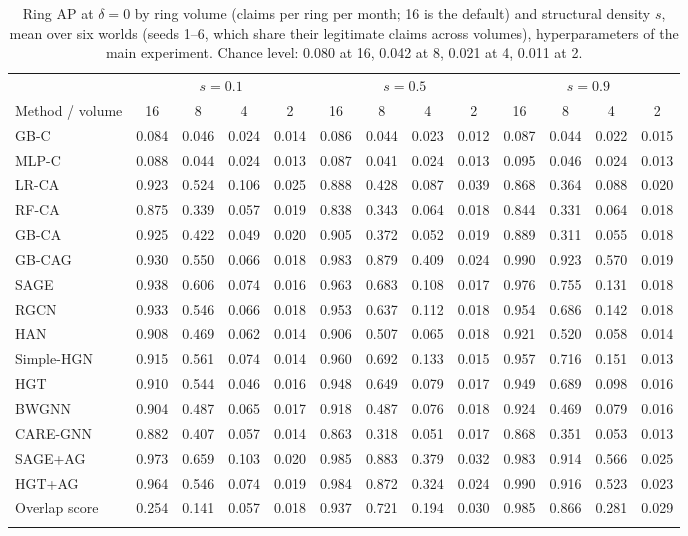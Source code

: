 \documentclass[pdflatex,sn-vancouver-num]{sn-jnl}
\begin{document}
\begin{table}[h]
\caption{Ring AP at $\delta=0$ by ring volume (claims per ring per month; 16 is the default) and structural density $s$, mean over six worlds (seeds 1--6, which share their legitimate claims across volumes), hyperparameters of the main experiment. Chance level: 0.080 at 16, 0.042 at 8, 0.021 at 4, 0.011 at 2.}\label{tab:dose}
\scriptsize
\setlength{\tabcolsep}{2pt}
\begin{tabular}{@{}lcccccccccccc@{}}
\toprule
 & \multicolumn{4}{c}{$s=0.1$} & \multicolumn{4}{c}{$s=0.5$} & \multicolumn{4}{c}{$s=0.9$} \\
\cmidrule(lr){2-5}\cmidrule(lr){6-9}\cmidrule(lr){10-13}
Method / volume & 16 & 8 & 4 & 2 & 16 & 8 & 4 & 2 & 16 & 8 & 4 & 2 \\
\midrule
GB-C & 0.084 & 0.046 & 0.024 & 0.014 & 0.086 & 0.044 & 0.023 & 0.012 & 0.087 & 0.044 & 0.022 & 0.015 \\
MLP-C & 0.088 & 0.044 & 0.024 & 0.013 & 0.087 & 0.041 & 0.024 & 0.013 & 0.095 & 0.046 & 0.024 & 0.013 \\
LR-CA & 0.923 & 0.524 & 0.106 & 0.025 & 0.888 & 0.428 & 0.087 & 0.039 & 0.868 & 0.364 & 0.088 & 0.020 \\
RF-CA & 0.875 & 0.339 & 0.057 & 0.019 & 0.838 & 0.343 & 0.064 & 0.018 & 0.844 & 0.331 & 0.064 & 0.018 \\
GB-CA & 0.925 & 0.422 & 0.049 & 0.020 & 0.905 & 0.372 & 0.052 & 0.019 & 0.889 & 0.311 & 0.055 & 0.018 \\
GB-CAG & 0.930 & 0.550 & 0.066 & 0.018 & 0.983 & 0.879 & 0.409 & 0.024 & 0.990 & 0.923 & 0.570 & 0.019 \\
\midrule
SAGE & 0.938 & 0.606 & 0.074 & 0.016 & 0.963 & 0.683 & 0.108 & 0.017 & 0.976 & 0.755 & 0.131 & 0.018 \\
RGCN & 0.933 & 0.546 & 0.066 & 0.018 & 0.953 & 0.637 & 0.112 & 0.018 & 0.954 & 0.686 & 0.142 & 0.018 \\
HAN & 0.908 & 0.469 & 0.062 & 0.014 & 0.906 & 0.507 & 0.065 & 0.018 & 0.921 & 0.520 & 0.058 & 0.014 \\
Simple-HGN & 0.915 & 0.561 & 0.074 & 0.014 & 0.960 & 0.692 & 0.133 & 0.015 & 0.957 & 0.716 & 0.151 & 0.013 \\
HGT & 0.910 & 0.544 & 0.046 & 0.016 & 0.948 & 0.649 & 0.079 & 0.017 & 0.949 & 0.689 & 0.098 & 0.016 \\
\midrule
BWGNN & 0.904 & 0.487 & 0.065 & 0.017 & 0.918 & 0.487 & 0.076 & 0.018 & 0.924 & 0.469 & 0.079 & 0.016 \\
CARE-GNN & 0.882 & 0.407 & 0.057 & 0.014 & 0.863 & 0.318 & 0.051 & 0.017 & 0.868 & 0.351 & 0.053 & 0.013 \\
\midrule
SAGE+AG & 0.973 & 0.659 & 0.103 & 0.020 & 0.985 & 0.883 & 0.379 & 0.032 & 0.983 & 0.914 & 0.566 & 0.025 \\
HGT+AG & 0.964 & 0.546 & 0.074 & 0.019 & 0.984 & 0.872 & 0.324 & 0.024 & 0.990 & 0.916 & 0.523 & 0.023 \\
Overlap score & 0.254 & 0.141 & 0.057 & 0.018 & 0.937 & 0.721 & 0.194 & 0.030 & 0.985 & 0.866 & 0.281 & 0.029 \\
\botrule
\end{tabular}
\end{table}
\end{document}
